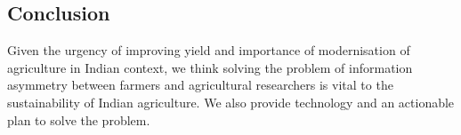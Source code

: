 \documentclass[a4paper]{scrartcl}
\begin{document}
\subsection{Conclusion}
Given the urgency of improving yield and importance of modernisation of agriculture in Indian context, we think solving the problem of information asymmetry between farmers and agricultural researchers is vital to the sustainability of Indian agriculture. 
We also provide technology and an actionable plan to solve the problem.



\end{document}
